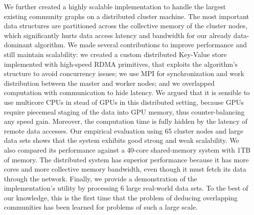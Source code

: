 We further created a highly scalable implementation to handle the largest existing
community graphs on a distributed cluster machine. The most important data structures
are partitioned across the collective memory of the cluster nodes, which
significantly hurts data access latency and bandwidth for our already data-dominant algorithm.
We made several contributions to improve performance and still maintain scalability:
we created a custom distributed Key-Value store implemented with high-speed RDMA
primitives, that exploits the algorithm's structure to avoid concurrency issues; we
use MPI for synchronization and work distribution between the master and worker nodes;
and
we overlapped computation
with communication to hide latency.
%
We argued that it is sensible to use multicore CPUs in stead of GPUs in this
distributed setting, because GPUs require piecemeal staging of the data into GPU
memory, thus counter-balancing any speed gain. Moreover, the computation time is
fully hidden by the latency of remote data accesses.
%
Our empirical evaluation using 65 cluster nodes and large data sets
shows that the system exhibits good strong and weak scalability. We also compared its
performance against a 40-core shared-memory system with 1TB of memory.
The distributed system has superior performance because it has more cores and
more collective memory bandwidth, even though it must fetch its data through the network.
Finally, we provide a
demonstration of the implementation's utility by processing 6
large real-world data sets.
To the best of
our knowledge, this is the first time that the problem of deducing overlapping
communities has been learned for problems of such a large scale.
